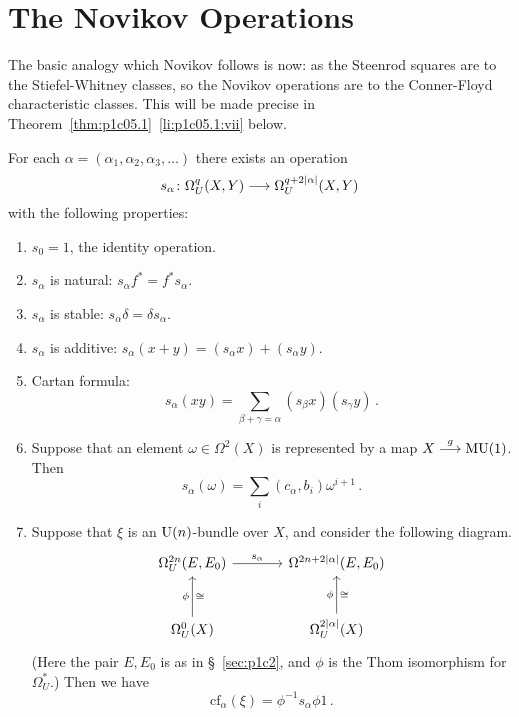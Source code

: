 \documentclass[../main]{subfiles}
\begin{document}
\label{sec:p1c5}

\chapter{The Novikov Operations}
The basic analogy which Novikov follows is now: as the Steenrod squares are to the Stiefel-Whitney classes, so the Novikov operations are to the Conner-Floyd characteristic classes.
This will be made precise in Theorem~\ref*{thm:p1c05.1}~\ref{li:p1c05.1:vii} below.

\begin{theorem}[S.P. Novikov]
\label{thm:p1c05.1}
For each $\alpha = (\alpha_1, \alpha_2, \alpha_3, \ldots)$ there exists an operation 
\begin{equation*}
	s_\alpha\colon \Omega_U^q(X, Y) \longrightarrow \Omega_U^{q + 2\lvert\alpha\rvert} (X, Y)
\end{equation*}
with the following properties:
\begin{enumerate}[label=(\roman*)]
	\item \label{li:p1c05.1:i}$s_0 = 1$, the identity operation.
	\item \label{li:p1c05.1:ii} $s_\alpha$ is natural: $s_\alpha f^\ast = f^\ast s_\alpha$.
	\item \label{li:p1c05.1:iii} $s_\alpha$ is stable: $s_\alpha \delta = \delta s_\alpha$.
	\item \label{li:p1c05.1:iv}$s_\alpha$ is additive: $s_\alpha (x + y) = (s_\alpha x) + (s_\alpha y)$.
	\item \label{li:p1c05.1:v} Cartan formula:
		\begin{equation*}
			s_\alpha(xy) = \sum_{\beta + \gamma = \alpha} (s_\beta x) (s_\gamma y)\,.
		\end{equation*}
	\item \label{li:p1c05.1:vi} Suppose that an element $\omega \in \Omega^2(X)$ is represented by a map $X \stackrel{g}{\longrightarrow} \mathrm{MU}(1)$. 
	Then 
		\begin{equation*}
			s_\alpha(\omega) = \sum_i (c_\alpha, b_i) \omega^{i + 1}\,.
		\end{equation*}
	\item \label{li:p1c05.1:vii} Suppose that $\xi$ is an $\mathrm{U}(n)$-bundle over $X$, and consider the following diagram.
	\begin{equation*}
		\begin{tikzcd}[row sep=large, column sep=large]
			\Omega_U^{2n}(E, E_0) \arrow[r, "s_\alpha"]	& {\Omega^{2n + 2\abs{\alpha}}(E, E_0)}\\ 
			\Omega_U^0(X) \arrow[u, "\phi", "\cong"']	& \Omega_U^{2\abs{\alpha}}(X) \arrow[u, "\phi", "\cong"']
		\end{tikzcd}
	\end{equation*}
	(Here the pair $E, E_0$ is as in \S~\ref{sec:p1c2}, and $\phi$ is the Thom isomorphism for $\Omega_U^\ast$.) 
	Then we have 
		\begin{equation*}
			\mathrm{cf}_\alpha(\xi) = \phi^{-1} s_\alpha \phi 1\,.
		\end{equation*}
\end{enumerate}
\end{theorem}
\end{document}

